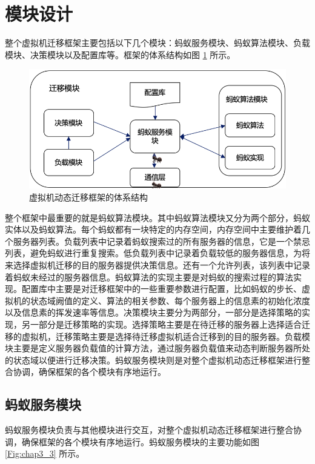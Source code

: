 \section{模块设计}
整个虚拟机迁移框架主要包括以下几个模块：蚂蚁服务模块、蚂蚁算法模块、负载模块、决策模块以及配置库等。框架的体系结构如图 \ref{Fig:chap3_2} 所示。

\begin{figure}[htb]
  \centering
  \includegraphics{./Figure/IMG_Chap3_2.png}
  \caption{虚拟机动态迁移框架的体系结构}\label{Fig:chap3_2}
\end{figure}

整个框架中最重要的就是蚂蚁算法模块。其中蚂蚁算法模块又分为两个部分，蚂蚁实体以及蚂蚁算法。每个蚂蚁都有一块特定的内存空间，内存空间中主要维护着几个服务器列表。负载列表中记录着蚂蚁搜索过的所有服务器的信息，它是一个禁忌列表，避免蚂蚁进行重复搜索。低负载列表中记录着负载较低的服务器信息，为将来选择虚拟机迁移的目的服务器提供决策信息。还有一个允许列表，该列表中记录着蚂蚁未经过的服务器信息。蚂蚁算法的实现主要是对蚂蚁的搜索过程的算法实现。配置库中主要是对迁移框架中的一些重要参数进行配置，比如蚂蚁的步长、虚拟机的状态域阙值的定义、算法的相关参数、每个服务器上的信息素的初始化浓度以及信息素的挥发速率等信息。决策模块主要分为两部分，一部分是选择策略的实现，另一部分是迁移策略的实现。选择策略主要是在待迁移的服务器上选择适合迁移的虚拟机，迁移策略主要是选择待迁移虚拟机适合迁移到的目的服务器。负载模块主要是定义服务器负载值的计算方法，通过服务器负载值来动态判断服务器所处的状态域以便进行迁移决策。蚂蚁服务模块则是对整个虚拟机动态迁移框架进行整合协调，确保框架的各个模块有序地运行。

\subsection{蚂蚁服务模块}
蚂蚁服务模块负责与其他模块进行交互，对整个虚拟机动态迁移框架进行整合协调，确保框架的各个模块有序地运行。蚂蚁服务模块的主要功能如图 \ref{Fig:chap3_3} 所示。

